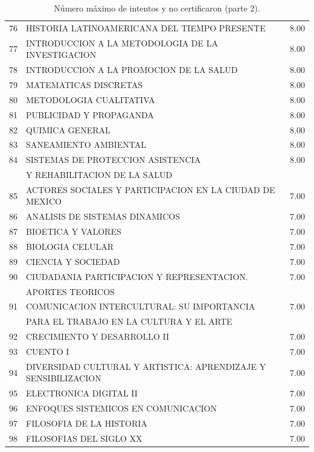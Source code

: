\documentclass[12pt]{article}
\begin{document}
\begin{table}[ht]
{\begin{tabular}{rlr}
  76 & HISTORIA LATINOAMERICANA DEL TIEMPO PRESENTE & 8.00 \\ 
  77 & INTRODUCCION A LA METODOLOGIA DE LA INVESTIGACION & 8.00 \\ 
  78 & INTRODUCCION A LA PROMOCION DE LA SALUD & 8.00 \\ 
  79 & MATEMATICAS DISCRETAS & 8.00 \\ 
  80 & METODOLOGIA CUALITATIVA & 8.00 \\ 
  81 & PUBLICIDAD Y PROPAGANDA & 8.00 \\ 
  82 & QUIMICA GENERAL & 8.00 \\ 
  83 & SANEAMIENTO AMBIENTAL & 8.00 \\ 
  84 & SISTEMAS DE PROTECCION ASISTENCIA  & 8.00 \\ 
  & Y REHABILITACION DE LA SALUD &  \\ 
  85 & ACTORES SOCIALES Y PARTICIPACION EN LA CIUDAD DE MEXICO & 7.00 \\ 
  86 & ANALISIS DE SISTEMAS DINAMICOS & 7.00 \\ 
  87 & BIOETICA Y VALORES & 7.00 \\ 
  88 & BIOLOGIA CELULAR & 7.00 \\ 
  89 & CIENCIA Y SOCIEDAD & 7.00 \\ 
  90 & CIUDADANIA PARTICIPACION Y REPRESENTACION. & 7.00 \\ 
   & APORTES TEORICOS &  \\ 
  91 & COMUNICACION INTERCULTURAL: SU IMPORTANCIA& 7.00 \\ 
   & PARA EL TRABAJO EN LA CULTURA Y EL ARTE & \\ 
  92 & CRECIMIENTO Y DESARROLLO II & 7.00 \\ 
 93 & CUENTO I & 7.00 \\ 
  94 & DIVERSIDAD CULTURAL Y ARTISTICA: APRENDIZAJE Y SENSIBILIZACION & 7.00 \\ 
  95 & ELECTRONICA DIGITAL II & 7.00 \\ 
  96 & ENFOQUES SISTEMICOS EN COMUNICACION & 7.00 \\ 
  97 & FILOSOFIA DE LA HISTORIA & 7.00 \\ 
  98 & FILOSOFIAS DEL SIGLO XX & 7.00 \\ 
   \hline
\end{tabular}
}\caption{\label{Num_Max_Intentos_Nunca_Cert_2} N\'umero m\'aximo de intentos y no certificaron (parte 2).}

\end{table}
\end{document}
